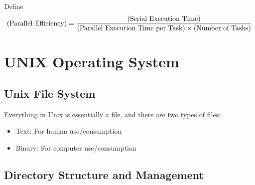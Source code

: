 \documentclass[12pt]{article}
\theoremstyle{plain}
\theoremstyle{definition}
\theoremstyle{remark}
\begin{document}
Define
\begin{align*}
  \text{(Parallel Efficiency)}
  =
  \frac{%
    \text{(Serial Execution Time)}
  }{%
    \text{(Parallel Execution Time per Task)}
    \times
    \text{(Number of Tasks)}
  }
\end{align*}




\clearpage
\section{UNIX Operating System}

\subsection{Unix File System}

Everything in Unix is essentially a file, and there are two types of
files:
\begin{itemize}
  \item Text: For human use/consumption
  \item Binary: For computer use/consumption
\end{itemize}

\subsection{Directory Structure and Management}
\end{document}
